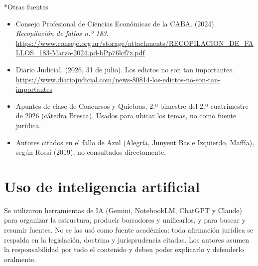 \documentclass[12pt,oneside]{book}
\makeatletter
\renewcommand\section{\@startsection{section}{1}{\z@}{-3.5ex \@plus -1ex \@minus -.2ex}{2.3ex \@plus.2ex}{\normalfont\Large\bfseries\raggedright}}
\makeatother
\begin{document}
\section*{Otras fuentes}

\begin{itemize}[leftmargin=*]
  \item Consejo Profesional de Ciencias Económicas de la CABA. (2024). \textit{Recopilación de fallos n.º 183}. \url{https://www.consejo.org.ar/storage/attachments/RECOPILACION_DE_FALLOS_183-Marzo-2024.pd-bPp76lcf7z.pdf}
  \item Diario Judicial. (2026, 31 de julio). Los edictos no son tan importantes. \url{https://www.diariojudicial.com/news-80814-los-edictos-no-son-tan-importantes}
  \item Apuntes de clase de Concursos y Quiebras, 2.º bimestre del 2.º cuatrimestre de 2026 (cátedra Bresca). Usados para ubicar los temas, no como fuente jurídica.
  \item Autores citados en el fallo de Azul (Alegría, Junyent Bas e Izquierdo, Maffía), según Rossi (2019), no consultados directamente.
\end{itemize}

\chapter*{Uso de inteligencia artificial}

Se utilizaron herramientas de IA (Gemini, NotebookLM, ChatGPT y Claude) para organizar la estructura, producir borradores y unificarlos, y para buscar y resumir fuentes. No se las usó como fuente académica: toda afirmación jurídica se respalda en la legislación, doctrina y jurisprudencia citadas. Los autores asumen la responsabilidad por todo el contenido y deben poder explicarlo y defenderlo oralmente.
\end{document}
